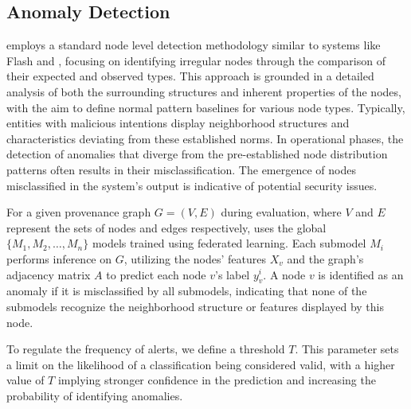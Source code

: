 \subsection{Anomaly Detection}
\Sys employs a standard node level detection methodology similar to systems like Flash and \threatrace, focusing on identifying irregular nodes through the comparison of their expected and observed types. This approach is grounded in a detailed analysis of both the surrounding structures and inherent properties of the nodes, with the aim to define normal pattern baselines for various node types. Typically, entities with malicious intentions display neighborhood structures and characteristics deviating from these established norms. In operational phases, the detection of anomalies that diverge from the pre-established node distribution patterns often results in their misclassification. The emergence of nodes misclassified in the system's output is indicative of potential security issues.

For a given provenance graph \(G = (V, E)\) during evaluation, where \(V\) and \(E\) represent the sets of nodes and edges respectively, \Sys uses the global \(\{M_1, M_2, \ldots, M_n\}\) \gnnshort models trained using federated learning. Each submodel \(M_i\) performs inference on \(G\), utilizing the nodes' features \(X_v\) and the graph's adjacency matrix \(A\) to predict each node \(v\)'s label \(y_v^i\). A node \(v\) is identified as an anomaly if it is misclassified by all submodels, indicating that none of the submodels recognize the neighborhood structure or features displayed by this node. 

To regulate the frequency of alerts, we define a threshold \(T\). This parameter sets a limit on the likelihood of a classification being considered valid, with a higher value of \(T\) implying stronger confidence in the prediction and increasing the probability of identifying anomalies. 